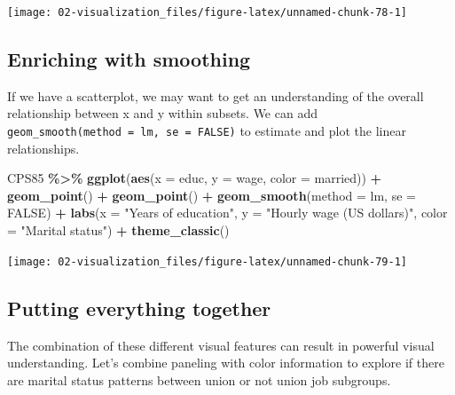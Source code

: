 \documentclass[
]{book}
\newenvironment{Shaded}{\begin{snugshade}}{\end{snugshade}}
\newcommand{\AttributeTok}[1]{\textcolor[rgb]{0.13,0.29,0.53}{#1}}
\newcommand{\ConstantTok}[1]{\textcolor[rgb]{0.56,0.35,0.01}{#1}}
\newcommand{\FunctionTok}[1]{\textcolor[rgb]{0.13,0.29,0.53}{\textbf{#1}}}
\newcommand{\NormalTok}[1]{#1}
\newcommand{\SpecialCharTok}[1]{\textcolor[rgb]{0.81,0.36,0.00}{\textbf{#1}}}
\newcommand{\StringTok}[1]{\textcolor[rgb]{0.31,0.60,0.02}{#1}}
\begin{document}
\begin{center}\texttt{[image: 02-visualization\_files/figure-latex/unnamed-chunk-78-1]} \end{center}

\subsection{Enriching with smoothing}\label{enriching-with-smoothing}

If we have a scatterplot, we may want to get an understanding of the overall relationship between x and y within subsets. We can add \texttt{geom\_smooth(method\ =\ \textquotesingle{}lm\textquotesingle{},\ se\ =\ FALSE)} to estimate and plot the linear relationships.

\begin{Shaded}
\begin{Highlighting}[]
\NormalTok{CPS85 }\SpecialCharTok{\%\textgreater{}\%}
    \FunctionTok{ggplot}\NormalTok{(}\FunctionTok{aes}\NormalTok{(}\AttributeTok{x =}\NormalTok{ educ, }\AttributeTok{y =}\NormalTok{ wage, }\AttributeTok{color =}\NormalTok{ married)) }\SpecialCharTok{+}
    \FunctionTok{geom\_point}\NormalTok{() }\SpecialCharTok{+}
    \FunctionTok{geom\_point}\NormalTok{() }\SpecialCharTok{+}
    \FunctionTok{geom\_smooth}\NormalTok{(}\AttributeTok{method =} \StringTok{\textquotesingle{}lm\textquotesingle{}}\NormalTok{, }\AttributeTok{se =} \ConstantTok{FALSE}\NormalTok{) }\SpecialCharTok{+}
    \FunctionTok{labs}\NormalTok{(}\AttributeTok{x =} \StringTok{"Years of education"}\NormalTok{, }\AttributeTok{y =} \StringTok{"Hourly wage (US dollars)"}\NormalTok{, }\AttributeTok{color =} \StringTok{"Marital status"}\NormalTok{) }\SpecialCharTok{+}
    \FunctionTok{theme\_classic}\NormalTok{()}
\end{Highlighting}
\end{Shaded}

\begin{center}\texttt{[image: 02-visualization\_files/figure-latex/unnamed-chunk-79-1]} \end{center}

\subsection{Putting everything together}\label{putting-everything-together}

The combination of these different visual features can result in powerful visual understanding. Let's combine paneling with color information to explore if there are marital status patterns between union or not union job subgroups.
\end{document}
